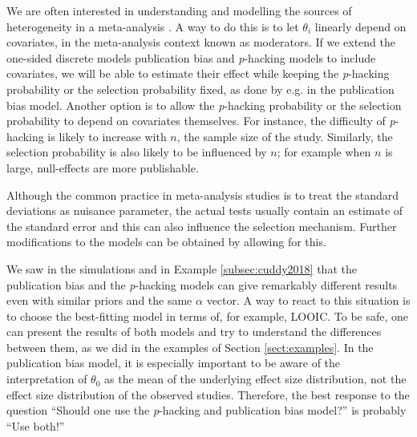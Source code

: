 \documentclass[useAMS,usenatbib,referee]{biom}
\begin{document}
We are often interested in understanding and modelling the sources of heterogeneity in a meta-analysis \citep{thompson1994systematic}. A way to do this is to let $\theta_{i}$ linearly depend on covariates, in the meta-analysis context known as moderators. If we extend the one-sided discrete models publication bias and \textit{p}-hacking models to include covariates, we will be able to estimate their effect while keeping the \textit{p}-hacking probability or the selection probability fixed, as done by e.g. \citet{Vevea1995-on} in the publication bias model. Another option is to allow the \textit{p}-hacking probability or the selection probability to depend on covariates themselves. For instance, the difficulty of \textit{p}-hacking is likely to increase with $n$, the sample size of the study. Similarly, the selection probability is also likely to be influenced by $n$; for example when $n$ is large, null-effects are more publishable.

Although the common practice in meta-analysis studies is to treat the standard deviations as nuisance parameter, the actual tests usually contain an estimate of the standard error and this can also influence the selection mechanism. Further modifications to the models can be obtained by allowing for this. 


We saw in the simulations and in Example \ref{subsec:cuddy2018} that the publication bias and the \textit{p}-hacking models can give remarkably different results even with similar priors and the same $\alpha$ vector. A way to react to this situation is to choose the best-fitting model in terms of, for example, LOOIC. To be safe, one can present the results of both models and try to understand the differences between them, as we did in the examples of Section \ref{sect:examples}. In the publication bias model, it is especially important to be aware of the interpretation of $\theta_{0}$ as the mean of the underlying effect size distribution, not the effect size distribution of the observed studies. Therefore, the best response to the question \enquote{Should one use the \textit{p}-hacking and publication bias model?} is probably \enquote{Use both!}
\end{document}
